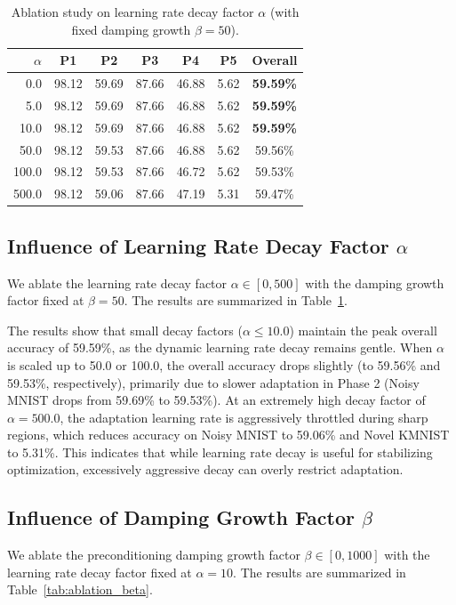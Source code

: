 \documentclass{article}
\theoremstyle{plain}
\theoremstyle{definition}
\theoremstyle{remark}
\begin{document}
\begin{table}[h]
\caption{Ablation study on learning rate decay factor $\alpha$ (with fixed damping growth $\beta=50$).}
\label{tab:ablation_alpha}
\centering
\begin{small}
\setlength{\tabcolsep}{4.5pt}
\begin{tabular}{rcccccc}
\toprule
\textbf{$\alpha$} & \textbf{P1} & \textbf{P2} & \textbf{P3} & \textbf{P4} & \textbf{P5} & \textbf{Overall} \\
\midrule
0.0   & 98.12 & 59.69 & 87.66 & 46.88 & 5.62 & \textbf{59.59\%} \\
5.0   & 98.12 & 59.69 & 87.66 & 46.88 & 5.62 & \textbf{59.59\%} \\
10.0  & 98.12 & 59.69 & 87.66 & 46.88 & 5.62 & \textbf{59.59\%} \\
50.0  & 98.12 & 59.53 & 87.66 & 46.88 & 5.62 & 59.56\% \\
100.0 & 98.12 & 59.53 & 87.66 & 46.72 & 5.62 & 59.53\% \\
500.0 & 98.12 & 59.06 & 87.66 & 47.19 & 5.31 & 59.47\% \\
\bottomrule
\end{tabular}
\end{small}
\end{table}

\subsection{Influence of Learning Rate Decay Factor $\alpha$}
We ablate the learning rate decay factor $\alpha \in [0, 500]$ with the damping growth factor fixed at $\beta=50$. The results are summarized in Table~\ref{tab:ablation_alpha}.

The results show that small decay factors ($\alpha \le 10.0$) maintain the peak overall accuracy of 59.59\%, as the dynamic learning rate decay remains gentle. When $\alpha$ is scaled up to 50.0 or 100.0, the overall accuracy drops slightly (to 59.56\% and 59.53\%, respectively), primarily due to slower adaptation in Phase 2 (Noisy MNIST drops from 59.69\% to 59.53\%). At an extremely high decay factor of $\alpha=500.0$, the adaptation learning rate is aggressively throttled during sharp regions, which reduces accuracy on Noisy MNIST to 59.06\% and Novel KMNIST to 5.31\%. This indicates that while learning rate decay is useful for stabilizing optimization, excessively aggressive decay can overly restrict adaptation.

\subsection{Influence of Damping Growth Factor $\beta$}
We ablate the preconditioning damping growth factor $\beta \in [0, 1000]$ with the learning rate decay factor fixed at $\alpha=10$. The results are summarized in Table~\ref{tab:ablation_beta}.
\end{document}
